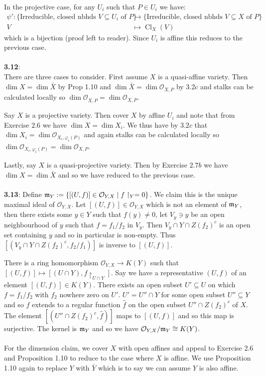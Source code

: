 \documentclass[12pt]{article}
\numberwithin{thm}{subsection}
\numberwithin{defn}{subsection}
\numberwithin{lemma}{subsection}
\numberwithin{example}{subsection}
\numberwithin{notation}{subsection}
\numberwithin{cor}{subsection}
\numberwithin{remark}{subsection}
\numberwithin{condition}{subsection}
\numberwithin{question}{subsection}
\numberwithin{construction}{subsection}
\numberwithin{construction}{subsection}
\numberwithin{construction}{subsection}
\newcommand{\call}[1]{\mathcal{#1}}
\newcommand{\lto}{\longrightarrow}
\begin{document}
In the projective case, for any $U_i$ such that $P \in U_i$ we have:
\begin{align*}
    \psi': \lbrace \text{Irreducible, closed nbhds }V \subseteq U_i\text{ of }P\rbrace &\to \lbrace \text{Irreducible, closed nbhds }V \subseteq X\text{ of }P\rbrace\\
    V &\mapsto \operatorname{Cl}_X(V)
\end{align*}
which is a bijection (proof left to reader). Since $U_i$ is affine this reduces to the previous case.\\\\
%
\textbf{3.12}:\\
There are three cases to consider. First assume $X$ is a quasi-affine variety. Then $\operatorname{dim}X = \operatorname{dim}\bar{X}$ by Prop 1.10 and $\operatorname{dim}\bar{X} = \operatorname{dim}\call{O}_{\bar{X},P}$ by 3.2c and stalks can be calculated locally so $\operatorname{dim}\call{O}_{\bar{X},P} = \operatorname{dim}\call{O}_{X,P}$.

Say $X$ is a projective variety. Then cover $X$ by affine $U_i$ and note that from Exercise $2.6$ we have $\operatorname{dim}X = \operatorname{dim}X_i$. We thus have by $3.2c$ that $\operatorname{dim}X_i = \operatorname{dim}\call{O}_{X_i,\varphi_{i}(P)}$ and again stalks can be calculated locally so $\operatorname{dim}\call{O}_{X_i,\varphi_i(P)} = \operatorname{dim}\call{O}_{X,P}$.

Lastly, say $X$ is a quasi-projective variety. Then by Exercise $2.7b$ we have $\operatorname{dim}X = \operatorname{dim}\bar{X}$ and so we have reduced to the previous case.\\\\
%
\textbf{3.13}: Define $\frak{m}_Y := \lbrace [(U,f)] \in \call{O}_{Y,X} \mid f\restriction_Y = 0\rbrace$. We claim this is the unique maximal ideal of $\call{O}_{Y,X}$. Let $[(U,f)] \in \call{O}_{Y,X}$ which is not an element of $\frak{m}_Y$, then there exists some $y \in Y$ such that $f(y) \neq 0$, let $V_y \ni y$ be an open neighbourhood of $y$ such that $f = f_1/f_2$ in $V_y$. Then $V_y \cap Y \cap Z(f_2)^c$ is an open set containing $y$ and so in particular is non-empty. Thus $[(V_y \cap Y \cap Z(f_2)^c, f_2/f_1)]$ is inverse to $[(U,f)]$.

There is a ring homomorphism $\call{O}_{Y,X} \lto K(Y)$ such that $[(U,f)] \mapsto [(U \cap Y), f\restriction_{U \cap Y}]$. Say we have a representative $(U,f)$ of an element $[(U,f)] \in K(Y)$. There exists an open subset $U' \subseteq U$ on which $f = f_1/f_2$ with $f_2$ nowhere zero on $U'$. $U' = U'' \cap Y$ for some open subset $U'' \subseteq Y$ and so $f$ extends to a regular function $\hat{f}$ on the open subset $U'' \cap Z(f_2)^c$ of $X$. The element $[(U'' \cap Z(f_2)^c, \hat{f})]$ maps to $[(U,f)]$ and so this map is surjective. The kernel is $\frak{m}_Y$ and so we have $\call{O}_{Y,X}/\frak{m}_Y \cong K(Y)$.\\\\
%
For the dimension claim, we cover $X$ with open affines and appeal to Exercise 2.6 and Proposition 1.10 to reduce to the case where $X$ is affine. We use Proposition 1.10 again to replace $Y$ with $\bar{Y}$ which is to say we can assume $Y$ is also affine.
\end{document}
